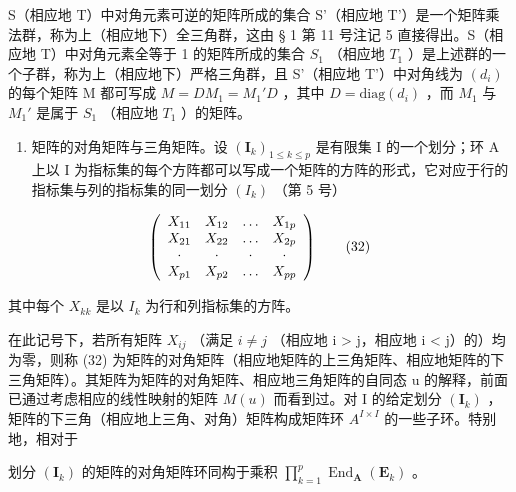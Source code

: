 S（相应地 T）中对角元素可逆的矩阵所成的集合 S'（相应地 T'）是一个矩阵乘法群，称为上（相应地下）全三角群，这由 § 1 第 11 号注记 5 直接得出。S（相应地 T）中对角元素全等于 1 的矩阵所成的集合 \(S_{1}\) （相应地 \(T_{1}\) ）是上述群的一个子群，称为上（相应地下）严格三角群，且 S'（相应地 T'）中对角线为 \((d_{i})\) 的每个矩阵 M 都可写成 \(M = DM_{1} = M_{1}'D\) ，其中 \(D = \mathrm{diag}(d_{i})\) ，而 \(M_{1}\) 与 \(M_{1}'\) 是属于 \(S_{1}\) （相应地 \(T_{1}\) ）的矩阵。

\begin{enumerate}
\def\labelenumi{\Roman{enumi}.}
\setcounter{enumi}{3}
\tightlist
\item
  矩阵的对角矩阵与三角矩阵。设 \((\mathbf{I}_k)_{1 \leqslant k \leqslant p}\) 是有限集 I 的一个划分；环 A 上以 I 为指标集的每个方阵都可以写成一个矩阵的方阵的形式，它对应于行的指标集与列的指标集的同一划分 \((I_{k})\) （第 5 号）
\end{enumerate}

\[
\left( \begin{array}{c c c c} X _ {1 1} & X _ {1 2} & \ldots & X _ {1 p} \\ X _ {2 1} & X _ {2 2} & \ldots & X _ {2 p} \\ \cdot & \cdot & \cdot & \cdot \\ X _ {p 1} & X _ {p 2} & \ldots & X _ {p p} \end{array} \right)\tag{32}
\]

其中每个 \(X_{kk}\) 是以 \(I_{k}\) 为行和列指标集的方阵。

在此记号下，若所有矩阵 \(X_{ij}\) （满足 \(i \neq j\) （相应地 i \textgreater{} j，相应地 i \textless{} j）的）均为零，则称 (32) 为矩阵的对角矩阵（相应地矩阵的上三角矩阵、相应地矩阵的下三角矩阵）。其矩阵为矩阵的对角矩阵、相应地三角矩阵的自同态 u 的解释，前面已通过考虑相应的线性映射的矩阵 \(M(u)\) 而看到过。对 I 的给定划分 \((\mathbf{I}_{k})\) ，矩阵的下三角（相应地上三角、对角）矩阵构成矩阵环 \(A^{I \times I}\) 的一些子环。特别地，相对于

划分 \((\mathbf{I}_k)\) 的矩阵的对角矩阵环同构于乘积 \(\prod_{k=1}^{p} \operatorname{End}_{\mathbf{A}}(\mathbf{E}_k)\) 。
